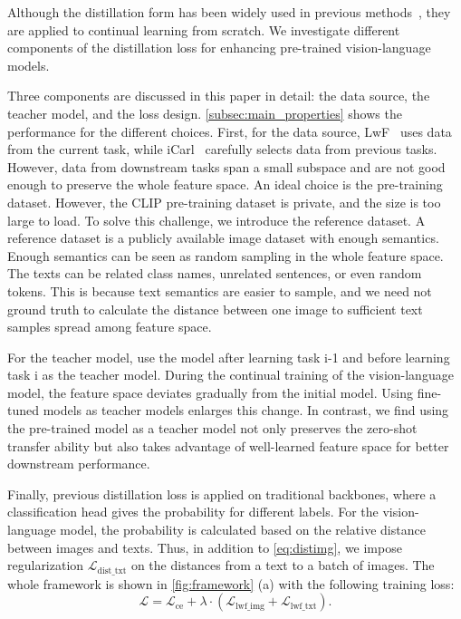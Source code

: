 Although the distillation form has been widely used in previous methods~\cite{hinton2015distilling,li2017learning,rebuffi2017icarl}, they are applied to continual learning from scratch. We investigate different components of the distillation loss for enhancing pre-trained vision-language models.

Three components are discussed in this paper in detail: the data source, the teacher model, and the loss design. \cref{subsec:main_properties} shows the performance for the different choices. First, for the data source, LwF~\cite{li2017learning} uses data from the current task, while iCarl~\cite{rebuffi2017icarl} carefully selects data from previous tasks. However, data from downstream tasks span a small subspace and are not good enough to preserve the whole feature space. An ideal choice is the pre-training dataset. However, the CLIP pre-training dataset is private, and the size is too large to load. To solve this challenge, we introduce the reference dataset. A reference dataset is a publicly available image dataset with enough semantics. Enough semantics can be seen as random sampling in the whole feature space. The texts can be related class names, unrelated sentences, or even random tokens. This is because text semantics are easier to sample, and we need not ground truth to calculate the distance between one image to sufficient text samples spread among feature space.

For the teacher model, \cite{li2017learning,rebuffi2017icarl} use the model after learning task i-1 and before learning task i as the teacher model. During the continual training of the vision-language model, the feature space deviates gradually from the initial model. Using fine-tuned models as teacher models enlarges this change. In contrast, we find using the pre-trained model as a teacher model not only preserves the zero-shot transfer ability but also takes advantage of well-learned feature space for better downstream performance.

Finally, previous distillation loss is applied on traditional backbones, where a classification head gives the probability for different labels. For the vision-language model, the probability is calculated based on the relative distance between images and texts. Thus, in addition to \cref{eq:distimg}, we impose regularization $\mathcal{L}_{\text{dist\_txt}}$ on the distances from a text to a batch of images. The whole framework is shown in \cref{fig:framework} (a) with the following training loss: \begin{equation}
    \mathcal{L} = \mathcal{L}_{\text{ce}}+\lambda\cdot (\mathcal{L}_{\text{lwf\_img}} + \mathcal{L}_{\text{lwf\_txt}}).
\end{equation}

